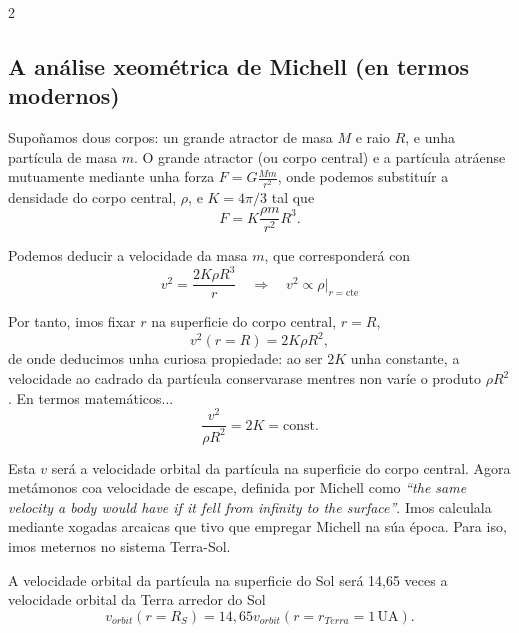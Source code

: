 \begin{multicols}{2}
\subsection*{A análise xeométrica de Michell (en termos modernos)}

Supoñamos dous corpos: un grande atractor de masa $M$ e raio $R$, e unha
partícula de masa $m$. O grande atractor (ou corpo central) e a partícula
atráense mutuamente mediante unha forza $F = G\frac{Mm}{r^2}$, onde podemos
substituír a densidade do corpo central, $\rho$, e $K = {4 \pi}/3$ tal que
%
\begin{equation}
  F = K\frac{\rho m}{r^2}R^3.
\end{equation}

Podemos deducir a velocidade da masa $m$, que corresponderá con
%
\begin{equation}
    v^2 = \frac{2K\rho R^3}{r} \quad\Rightarrow\quad v^2\propto
    \rho|_{r = \text{cte}}
\end{equation}

Por tanto, imos fixar $r$ na superficie do corpo central, $r=R$,
%
\begin{equation}
  v^2 (r=R) = 2K\rho R^2,
\end{equation}
%
de onde deducimos unha curiosa propiedade: ao ser $2K$ unha constante, a
velocidade ao cadrado da partícula conservarase mentres non varíe o produto
$\rho R^2$. En termos matemáticos...
%
\begin{equation}
    \frac{v^2}{\rho R^2} = 2K = \text{const.}
\end{equation}

Esta $v$ será a velocidade orbital da partícula na superficie do corpo central.
Agora metámonos coa velocidade de escape, definida por Michell como
\textit{``the same velocity a body would have if it fell from infinity to the
surface''}. Imos calculala mediante xogadas arcaicas que tivo que empregar
Michell na súa época. Para iso, imos meternos no sistema Terra-Sol.

A velocidade orbital da partícula na superficie do Sol será 14,65 veces a
velocidade orbital da Terra arredor do Sol
%
\begin{equation}
    v_{orbit}(r=R_S) = 14,65 v_{orbit}(r = r_{Terra}=1\,\text{UA}).
\end{equation}


\end{multicols}
